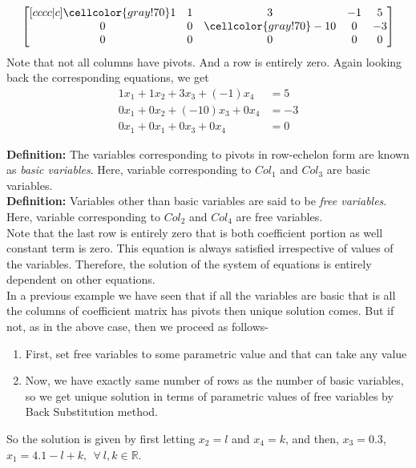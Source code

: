 \documentclass{article}
\newcommand\bg{\cellcolor{gray!70}}
\begin{document}
\begin{align}
\begin{bmatrix}[cccc|c] 
 \bg1 & 1 & 3 & -1 & 5 \\
 0 & 0 & \bg-10 & 0 & -3 \\
 0 & 0 & 0 & 0 & 0 
\end{bmatrix}\label{ef1}
\end{align}
Note that not all columns have pivots. And a row is entirely zero. Again looking back the corresponding equations, we get\\
\begin{align}
1x_1 + 1x_2 + 3x_3 +(-1)x_4 &= 5 \nonumber\\
0x_1 + 0x_2 + (-10)x_3 + 0x_4 &= -3 \nonumber\\
0x_1 + 0x_1 + 0x_3 + 0x_4 &= 0 \nonumber
\end{align}

\textbf{Definition:} The variables corresponding to pivots in row-echelon form are known as \textit{basic variables}. Here, variable corresponding to $Col_1$ and $Col_3$ are basic variables.\\

\textbf{Definition:} Variables other than basic variables are said to be \textit{free variables}.  Here, variable corresponding to $Col_2$ and $Col_4$ are free variables.\\

Note that the last row is entirely zero that is both coefficient portion as well constant term is zero. This equation is always satisfied irrespective of values of the variables. Therefore, the solution of the system of equations is entirely dependent on other equations.\\

In a previous example we have seen that if all the variables are basic that is all the columns of coefficient matrix has pivots then unique solution comes. But if not, as in the above case, then we proceed as follows- 
\begin{enumerate}
    \item First, set free variables to some parametric value and that can take any value
    \item Now, we have exactly same number of rows as the number of basic variables, so we get unique solution in terms of parametric values of free variables by Back Substitution method. 
\end{enumerate}
So the solution is given by first letting $x_2=l$ and $x_4=k$, and then, $x_3=0.3$, $x_1=4.1-l+k, ~~\forall~l,k\in \mathbb{R}$.\\
\end{document}
